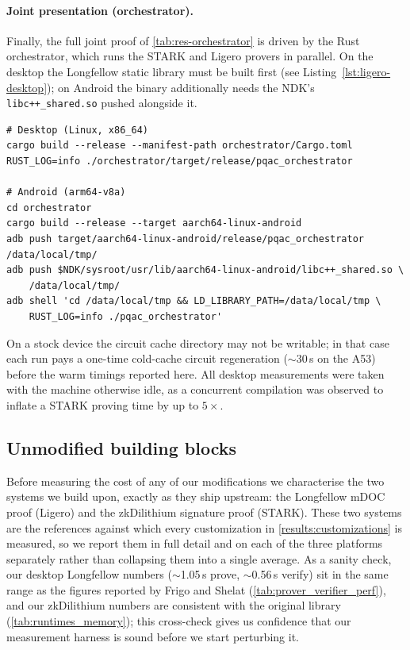 \documentclass{article}
\begin{document}
\paragraph{Joint presentation (orchestrator).}
Finally, the full joint proof of \cref{tab:res-orchestrator} is driven by the
Rust orchestrator, which runs the STARK and Ligero provers in parallel. On the
desktop the Longfellow static library must be built first (see
Listing~\ref{lst:ligero-desktop}); on Android the binary additionally needs the
NDK's
\texttt{libc++\_shared.so} pushed alongside it.
\begin{lstlisting}[caption={Joint presentation (orchestrator, STARK${+}$Ligero in parallel): desktop and Android.},label={lst:orch}]
# Desktop (Linux, x86_64)
cargo build --release --manifest-path orchestrator/Cargo.toml
RUST_LOG=info ./orchestrator/target/release/pqac_orchestrator

# Android (arm64-v8a)
cd orchestrator
cargo build --release --target aarch64-linux-android
adb push target/aarch64-linux-android/release/pqac_orchestrator /data/local/tmp/
adb push $NDK/sysroot/usr/lib/aarch64-linux-android/libc++_shared.so \
    /data/local/tmp/
adb shell 'cd /data/local/tmp && LD_LIBRARY_PATH=/data/local/tmp \
    RUST_LOG=info ./pqac_orchestrator'
\end{lstlisting}
On a stock device the circuit cache directory may not be writable; in that case
each run pays a one-time cold-cache circuit regeneration (\(\sim\)30\,s on the
A53) before the warm timings reported here. All desktop measurements were taken
with the machine otherwise idle, as a concurrent compilation was observed to
inflate a STARK proving time by up to $5\times$.

\subsection{Unmodified building blocks}
\label{results:baselines}
Before measuring the cost of any of our modifications we characterise the two
systems we build upon, exactly as they ship upstream: the Longfellow mDOC proof
(Ligero) and the zkDilithium signature proof (STARK). These two systems are the
references against which every customization in
\cref{results:customizations} is measured, so we report them in full detail and
on each of the three platforms separately rather than collapsing them into a
single average. As a sanity check, our desktop Longfellow numbers
($\sim$1.05\,s prove, $\sim$0.56\,s verify) sit in the same range as the figures
reported by Frigo and Shelat (\cref{tab:prover_verifier_perf}), and our
zkDilithium numbers are consistent with the original library
(\cref{tab:runtimes_memory}); this cross-check gives us confidence that our
measurement harness is sound before we start perturbing it.
\end{document}
